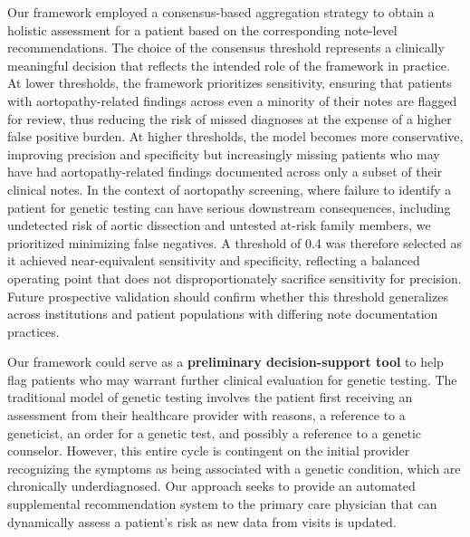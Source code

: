 \documentclass[fleqn,10pt]{wlscirep}
\begin{document}
Our framework employed a consensus-based aggregation strategy to obtain a holistic assessment for a patient based on the corresponding note-level recommendations. The choice of the consensus threshold represents a clinically meaningful decision that reflects the intended role of the framework in practice. At lower thresholds, the framework prioritizes sensitivity, ensuring that patients with aortopathy-related findings across even a minority of their notes are flagged for review, thus reducing the risk of missed diagnoses at the expense of a higher false positive burden. At higher thresholds, the model becomes more conservative, improving precision and specificity but increasingly missing patients who may have had aortopathy-related findings documented across only a subset of their clinical notes. In the context of aortopathy screening, where failure to identify a patient for genetic testing can have serious downstream consequences, including undetected risk of aortic dissection and untested at-risk family members, we prioritized minimizing false negatives. A threshold of 0.4 was therefore selected as it achieved near-equivalent sensitivity and specificity, reflecting a balanced operating point that does not disproportionately sacrifice sensitivity for precision. Future prospective validation should confirm whether this threshold generalizes across institutions and patient populations with differing note documentation practices.

Our framework could serve as a \textbf{preliminary decision-support tool} to help flag patients who may warrant further clinical evaluation for genetic testing. The traditional model of genetic testing involves the patient first receiving an assessment from their healthcare provider with reasons, a reference to a geneticist, an order for a genetic test, and possibly a reference to a genetic counselor. However, this entire cycle is contingent on the initial provider recognizing the symptoms as being associated with a genetic condition, which are chronically underdiagnosed.\cite{pederson2024commentary} Our approach seeks to provide an automated supplemental recommendation system to the primary care physician that can dynamically assess a patient’s risk as new data from visits is updated. 
\end{document}
